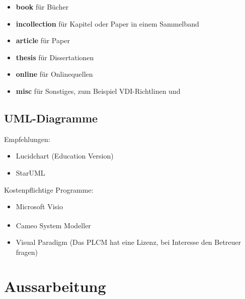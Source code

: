\begin{itemize}
    \item \textbf{book} für Bücher \cite{anderl_simulations}
    \item \textbf{incollection} für Kapitel oder Paper in einem Sammelband \cite{anderl_virtuelle_2020} 
    \item \textbf{article} für Paper \cite{shapingDT}  
    \item \textbf{thesis} für Dissertationen \cite{DissHaag}
    \item \textbf{online} für Onlinequellen \cite{PLCM}
    \item \textbf{misc} für Sonstiges, zum Beispiel VDI-Richtlinen \cite{VDI2206} und \cite{INCOSE2020} 
\end{itemize}


\subsection{UML-Diagramme}
Empfehlungen:
\begin{itemize}
    \item Lucidchart (Education Version)
    \item StarUML 
\end{itemize}

Kostenpflichtige Programme:
\begin{itemize}
    \item Microsoft Visio
    \item Cameo System Modeller\textsuperscript{\texttrademark}
    \item Visual Paradigm (Das PLCM hat eine Lizenz, bei Interesse den Betreuer fragen)
\end{itemize}



\section{Aussarbeitung}
\label{sec:Abschnitt}

